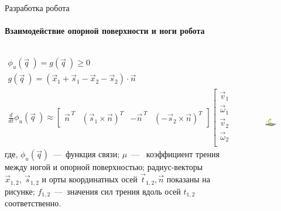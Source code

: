 \documentclass[aspectratio=169,xcolor=table]{beamer}
\begin{document}
\begin{frame}[t]{Разработка робота}
    \framesubtitle{Взаимодействие опорной поверхности и ноги робота}
    \vspace{-0.6cm}
        \begin{columns}[T,onlytextwidth]
            \begin{column}{0.69\textwidth}
                \begin{align*}
                    \phi_u(\vec{q}\ ) = g(\vec{q}\ ) \geqslant 0 \\ 
                    g(\vec{q}\ ) = (\vec{x}_1 + \vec{s}_1 - \vec{x}_2 - \vec{s}_2) \cdot \vec{n} \\
                    \frac{d }{d t}\phi_u(\vec{q}\ ) \approx \begin{bmatrix}
                        \vec{n}^{\ T} & (\vec{s}_1 \times \vec{n})^T & -\vec{n}^{\ T} & (-\vec{s}_2 \times \vec{n})^T
                    \end{bmatrix} \begin{bmatrix}
                        \vec{v}_1\\ 
                    \vec{\omega}_1\\ 
                    \vec{v}_2\\
                    \vec{\omega}_2\\
                    \end{bmatrix}
                \end{align*} 
                где, $\phi_u(\vec{q})$~---~функция связи; $ \mu $~---~ коэффициент трения между ногой и опорной поверхностью;  радиус-векторы $\vec{x}_{1,2},\ \vec{s}_{1,2}$ и орты координатных осей $\vec{t}_{1,2}, \vec{n}$ показаны на рисунке; $ f_{1,2} $~---~значения сил трения вдоль осей $t_{1,2}$ соответственно.
            \end{column}
            \begin{column}{0.29\textwidth}
                \vspace{-0.4cm}
                \begin{figure}[H]
                    \centering\includegraphics[height=6cm,width=1\textwidth,keepaspectratio]{contact_interaction.png}

\end{figure}
\end{column}
\end{columns}
\end{frame}
\end{document}
